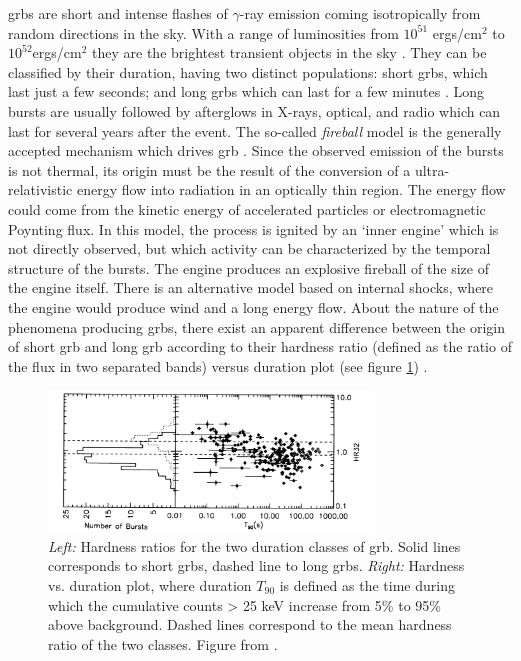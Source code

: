 \documentclass[main.tex]{subfiles}
\begin{document}
\glspl{grb} are short and intense flashes of $\gamma$-ray emission coming isotropically from random directions in the sky. With a range of luminosities from $10^{51}$ ergs/cm$^2$ to $10^{52} $ergs/cm$^2$ they are the brightest transient objects in the sky \cite{2004GRB}. They can be classified by their duration, having two distinct populations: short \glspl{grb}, which last just a few seconds; and long \glspl{grb} which can last for a few minutes \cite{1993GRB2pop}. Long bursts are usually followed by afterglows in X-rays, optical, and radio which can last for several years after the event.
The so-called \textit{fireball} model is the generally accepted mechanism which drives \gls{grb} \cite{1999GRBfireball}. Since the observed emission of the bursts is not thermal, its origin must be the result of the conversion of a ultra-relativistic energy flow into radiation in an optically thin region. The energy flow could come from the kinetic energy of accelerated particles or electromagnetic Poynting flux. In this model, the process is ignited by an `inner engine' which is not directly observed, but which activity can be characterized by the temporal structure of the bursts. The engine produces an explosive fireball of the size of the engine itself. There is an alternative model based on internal shocks, where the engine would produce wind and a long energy flow. About the nature of the phenomena producing \glspl{grb}, there exist an apparent difference between the origin of short \gls{grb} and long \gls{grb} according to their hardness ratio (defined as the ratio of the flux in two separated bands) versus duration plot (see figure \ref{fig:GRB2classes}) \cite{1993GRB2pop}.

\begin{figure}
\centering
 \includegraphics[width=0.77\textwidth]{Pictures/GRBhardnessdurationplot.pdf}
  \caption{\textit{Left:} Hardness ratios for the two duration classes of \gls{grb}. Solid lines corresponds to short \glspl{grb}, dashed line to long \glspl{grb}. \textit{Right:} Hardness vs. duration plot, where duration $T_{90}$ is defined as the time during which the cumulative counts > 25 keV increase from 5\% to 95\% above background. Dashed lines correspond to the mean hardness ratio of the two classes. Figure from \cite{1993GRB2pop}.}
    \label{fig:GRB2classes}
\end{figure}
\end{document}

